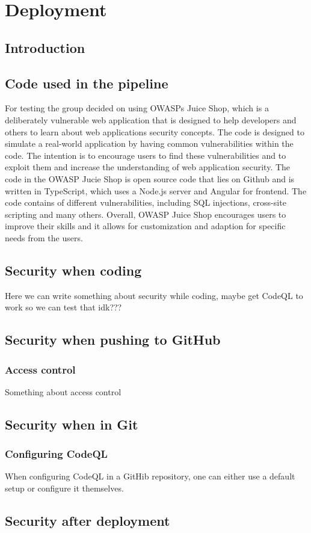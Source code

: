 \chapter{Deployment}
\section{Introduction}
\section{Code used in the pipeline}
For testing the group decided on using OWASPs Juice Shop, which is a deliberately vulnerable web application that is designed to help developers and others to learn about web applications security concepts. The code is designed to simulate a real-world application by having common vulnerabilities within the code. The intention is to encourage users to find these vulnerabilities and to exploit them and increase the understanding of web application security. \cite{owaspJuiceShop}
The code in the OWASP Jucie Shop is open source code that lies on Github and is written in TypeScript, which uses a Node.js server and Angular for frontend. \cite{owaspJuiceShopCode}
The code contains of different vulnerabilities, including SQL injections, cross-site scripting and many others. 
Overall, OWASP Juice Shop encourages users to improve their skills and it allows for customization and adaption for specific needs from the users. 


\section{Security when coding}
Here we can write something about security while coding, maybe get CodeQL to work so we can test that idk???

\section{Security when pushing to GitHub}

\subsection{Access control}
Something about access control

\section{Security when in Git}

\subsection{Configuring CodeQL}
When configuring CodeQL in a GitHib repository, one can either use a default setup or configure it themselves. 


\section{Security after deployment}